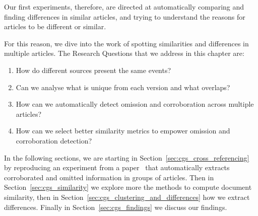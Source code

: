 Our first experiments, therefore, are directed at automatically comparing and finding differences in similar articles, and trying to understand the reasons for articles to be different or similar.

For this reason, we dive into the work of spotting similarities and differences in multiple articles.
The Research Questions that we address in this chapter are: 
\begin{enumerate}
    \item How do different sources present the same events?
    \item Can we analyse what is unique from each version and what overlaps? 
    \item How can we automatically detect omission and corroboration across multiple articles?
    \item How can we select better similarity metrics to empower omission and corroboration detection?
\end{enumerate}





In the following sections, we are starting in Section~\ref{sec:cgs_cross_referencing} by reproducing an experiment from a paper~\citep{bountouridis2018explaining} that automatically extracts corroborated and omitted information in groups of articles. Then in Section~\ref{sec:cgs_similarity} we explore more the methods to compute document similarity, then in Section~\ref{sec:cgs_clustering_and_differences} how we extract differences. Finally in Section~\ref{sec:cgs_findings} we discuss our findings.



